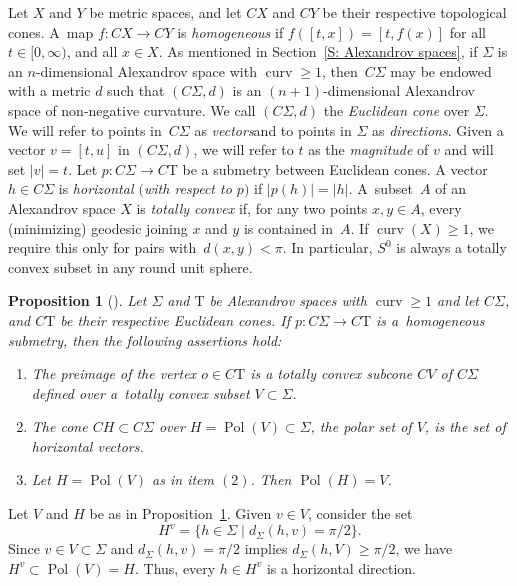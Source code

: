 \documentclass[10pt,a4paper]{amsart}
\numberwithin{equation}{section}
\newtheorem{prop}[thm]{Proposition}
\theoremstyle{definition}
\DeclareMathOperator{\curv}{curv}
\DeclareMathOperator{\Pol}{Pol}
\newcommand{\Sp}{S} %
\newcommand{\Tau}{\mathrm{T}}
\begin{document}
Let $X$ and $Y$ be metric spaces, and let $CX$ and $CY$ be their respective topological cones. A~map $f\colon CX\to CY$ is \emph{homogeneous} if
$
	f([t,x]) = [t,f(x)]
$
for all $t\in [0,\infty)$, and all $x\in X$. As mentioned in Section~\ref{S: Alexandrov spaces}, if $\Sigma$ is an $n$-dimensional Alexandrov space with $\curv\geq 1$, then~$C\Sigma$ may be endowed with a metric $d$ such that $(C\Sigma,d)$ is an $(n+1)$-dimensional Alexandrov space of non-negative curvature. We call $(C\Sigma,d)$ the \emph{Euclidean cone} over $\Sigma$. We will refer to points in~$C\Sigma$ as \emph{vectors}and to points in $\Sigma$ as \emph{directions}.
Given a vector $v=[t,u]$ in $(C\Sigma,d)$, we will refer to $t$ as the \emph{magnitude} of $v$ 	and will set $|v| = t$. Let $p\colon C\Sigma \to C\Tau$ be a submetry between Euclidean cones. A vector $h\in C\Sigma$ is \emph{horizontal $($with respect to $p)$} if $|p(h)| = |h|$.
 A~subset~$A$ of an Alexandrov space $X$ is \emph{totally convex} if, for any two points $x,y\in A$, every (minimizing) geodesic joining $x$ and $y$ is contained in~$A$. If $\curv(X)\geq 1$, we require this only for pairs with~$d(x,y)<\pi$. In particular, $\Sp^0$ is always a totally convex subset in any round unit sphere.
	
\begin{prop}[]
		\label{P: Horizontal and Vertical spaces of space of directions of submetry}
Let $\Sigma$ and $\Tau$ be Alexandrov spaces with $\curv\geq 1$ and let $C\Sigma$, and $C\Tau$ be their respective Euclidean cones. If $p\colon C\Sigma\to C\Tau$ is a~homogeneous submetry, then the following assertions hold:
\begin{enumerate}\itemsep=0pt
	\item[$(1)$] The preimage of the vertex $o\in C\Tau$ is a totally convex subcone $CV$ of $C\Sigma$ defined over a~totally convex subset $V\subset \Sigma$.
	\item[$(2)$] The cone $CH\subset C\Sigma$ over $H = \Pol(V)\subset \Sigma$, the polar set of $V$, is the set of horizontal vectors.
	\item[$(3)$] Let $H=\Pol(V)$ as in item $(2)$. Then $\Pol(H)=V$.
\end{enumerate}
\end{prop}

Let $V$ and $H$ be as in Proposition~\ref{P: Horizontal and Vertical spaces of space of directions of submetry}. %
Given $v\in V$, consider the set
\[
	H^v = \{h\in \Sigma \mid d_{\Sigma}(h,v) = \pi/2\}. %
\]
Since $v\in V\subset\Sigma$ and $d_\Sigma(h,v)=\pi/2$ implies $d_\Sigma(h,V)\ge\pi/2$,
we have $H^v\subset \Pol(V)=H$. Thus, every $h\in H^v$ is a horizontal direction.
\end{document}
